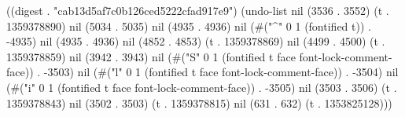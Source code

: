 
((digest . "cab13d5af7c0b126ced5222cfad917e9") (undo-list nil (3536 . 3552) (t . 1359378890) nil (5034 . 5035) nil (4935 . 4936) nil (#("^" 0 1 (fontified t)) . -4935) nil (4935 . 4936) nil (4852 . 4853) (t . 1359378869) nil (4499 . 4500) (t . 1359378859) nil (3942 . 3943) nil (#("S" 0 1 (fontified t face font-lock-comment-face)) . -3503) nil (#("l" 0 1 (fontified t face font-lock-comment-face)) . -3504) nil (#("i" 0 1 (fontified t face font-lock-comment-face)) . -3505) nil (3503 . 3506) (t . 1359378843) nil (3502 . 3503) (t . 1359378815) nil (631 . 632) (t . 1353825128)))
